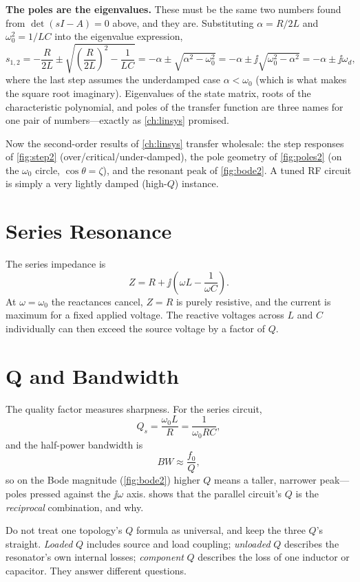 \begin{physicalbox}
\textbf{The poles are the eigenvalues.} These must be the same two numbers found
from \(\det(sI-A)=0\) above, and they are. Substituting
\(\alpha=R/2L\) and \(\omega_0^2=1/LC\) into the eigenvalue expression,
\[
s_{1,2}=-\frac{R}{2L}\pm\sqrt{\left(\frac{R}{2L}\right)^{2}-\frac{1}{LC}}
=-\alpha\pm\sqrt{\alpha^2-\omega_0^2}
=-\alpha\pm\jj\sqrt{\omega_0^2-\alpha^2}
=-\alpha\pm\jj\omega_d,
\]
where the last step assumes the underdamped case \(\alpha<\omega_0\) (which is what
makes the square root imaginary). Eigenvalues of the state matrix, roots of the
characteristic polynomial, and poles of the transfer function are three names for
one pair of numbers---exactly as \cref{ch:linsys} promised.
\end{physicalbox}
Now the second-order results of \cref{ch:linsys} transfer wholesale: the step
responses of \cref{fig:step2} (over/critical/under-damped), the pole geometry of
\cref{fig:poles2} (on the \(\omega_0\) circle, \(\cos\theta=\zeta\)), and the
resonant peak of \cref{fig:bode2}. A tuned RF circuit is simply a very
lightly damped (high-\(Q\)) instance.

\section{Series Resonance}
The series impedance is
\[
Z=R+\jj\left(\omega L-\frac{1}{\omega C}\right).
\]
At \(\omega=\omega_0\) the reactances cancel, \(Z=R\) is purely resistive, and the
current is maximum for a fixed applied voltage. The reactive voltages across \(L\)
and \(C\) individually can then exceed the source voltage by a factor of \(Q\).

\section{Q and Bandwidth}
The quality factor measures sharpness. For the series circuit,
\[
Q_s=\frac{\omega_0 L}{R}=\frac{1}{\omega_0 RC},
\]
and the half-power bandwidth is
\[
BW\approx\frac{f_0}{Q},
\]
so on the Bode magnitude (\cref{fig:bode2}) higher \(Q\) means a taller, narrower
peak---poles pressed against the \(\jj\omega\) axis.  shows that
the parallel circuit's \(Q\) is the \emph{reciprocal} combination, and why.

\begin{mistakebox}
Do not treat one topology's \(Q\) formula as universal, and keep the three
\(Q\)'s straight. \emph{Loaded} \(Q\) includes source and load coupling;
\emph{unloaded} \(Q\) describes the resonator's own internal losses;
\emph{component} \(Q\) describes the loss of one inductor or capacitor. They
answer different questions.
\end{mistakebox}

